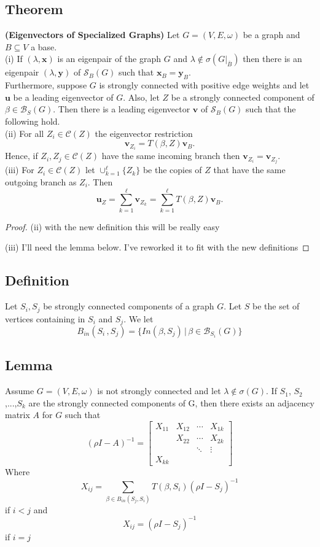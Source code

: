 \documentclass{paper}
\begin{document}
\subsection*{Theorem}\textbf{(Eigenvectors of Specialized Graphs)}
Let $G=(V,E,\omega)$ be a graph and $B\subseteq V$ a base.\\
(i) If $(\lambda,\mathbf{x})$ is an eigenpair of the graph $G$ and $\lambda\notin\sigma(G|_{\bar{B}})$ then there is an eigenpair $(\lambda,\mathbf{y})$ of $\mathcal{S}_B(G)$ such that $\mathbf{x}_B=\mathbf{y}_B$.\\
Furthermore, suppose $G$ is strongly connected with positive edge weights and let $\mathbf{u}$ be a leading eigenvector of $G$. Also, let $Z$ be a strongly connected component of $\beta\in\mathcal{B}_S(G)$. Then there is a leading eigenvector $\mathbf{v}$ of $\mathcal{S}_B(G)$ such that the following hold.\\
(ii) For all $Z_i\in\mathcal{C}(Z)$ the eigenvector restriction 
\[
\mathbf{v}_{Z_i}=T(\beta,Z)\mathbf{v}_B.
\] 
Hence, if $Z_i,Z_j\in\mathcal{C}(Z)$ have the same incoming branch then $\mathbf{v}_{Z_i}=\mathbf{v}_{Z_j}$.\\
(iii) For $Z_i\in\mathcal{C}(Z)$ let $\cup_{k=1}^\ell\{Z_k\}$ be the copies of $Z$ that have the same outgoing branch as $Z_i$. Then
\[
\mathbf{u}_Z=\sum_{k=1}^{\ell}\mathbf{v}_{Z_k}=\sum_{k=1}^{\ell}T(\beta,Z)\mathbf{v}_B.
\]

\begin{proof}

(ii) with the new definition this will be really easy

(iii) I'll need the lemma below. I've reworked it to fit with the new definitions
\end{proof}

\subsection*{Definition} Let $S_i,S_j$ be strongly connected components of a graph $G$. Let $S$ be the set of vertices containing in $S_i$ and $S_j$. We let
\[
B_{in}(S_i\,,S_j) = \{ In(\beta,S_j)\, |\, \beta \in \mathcal{B}_{S_i}(G) \}
\]
\subsection*{Lemma}Assume $G = (V,E,\omega)$ is not strongly connected and let $\lambda \notin \sigma(G)$. If $S_1$, $S_2$,...,$S_k$ are the strongly connected components of G, then there exists an adjacency matrix $A$ for $G$ such that 
\[
(\rho I - A)^{-1} =
\begin{bmatrix}
X_{11} & X_{12} & \cdots & X_{1k} \\
 & X_{22} & \cdots & X_{2k} \\
	& & \ddots & \vdots \\
	X_{kk} & & & 
\end{bmatrix}
\]
Where
\[ X_{ij} = \sum_{\beta \in B_{in}(S_j,S_i)} T(\beta,S_i)(\rho I - S_j)^{-1} 
\]
if $i < j$ and
\[ X_{ij} = (\rho I - S_j)^{-1} 
\]
if $i=j$
\end{document}
